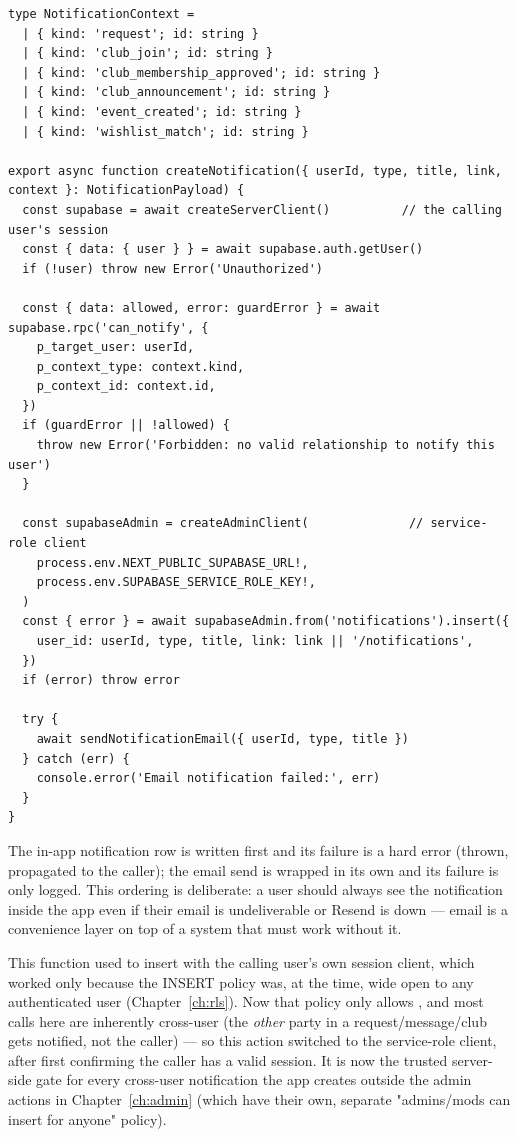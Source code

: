 \begin{lstlisting}[caption={src/lib/notifications.ts — in full}]
type NotificationContext =
  | { kind: 'request'; id: string }
  | { kind: 'club_join'; id: string }
  | { kind: 'club_membership_approved'; id: string }
  | { kind: 'club_announcement'; id: string }
  | { kind: 'event_created'; id: string }
  | { kind: 'wishlist_match'; id: string }

export async function createNotification({ userId, type, title, link, context }: NotificationPayload) {
  const supabase = await createServerClient()          // the calling user's session
  const { data: { user } } = await supabase.auth.getUser()
  if (!user) throw new Error('Unauthorized')

  const { data: allowed, error: guardError } = await supabase.rpc('can_notify', {
    p_target_user: userId,
    p_context_type: context.kind,
    p_context_id: context.id,
  })
  if (guardError || !allowed) {
    throw new Error('Forbidden: no valid relationship to notify this user')
  }

  const supabaseAdmin = createAdminClient(              // service-role client
    process.env.NEXT_PUBLIC_SUPABASE_URL!,
    process.env.SUPABASE_SERVICE_ROLE_KEY!,
  )
  const { error } = await supabaseAdmin.from('notifications').insert({
    user_id: userId, type, title, link: link || '/notifications',
  })
  if (error) throw error

  try {
    await sendNotificationEmail({ userId, type, title })
  } catch (err) {
    console.error('Email notification failed:', err)
  }
}
\end{lstlisting}

The in-app notification row is written first and its failure is a hard error (thrown, propagated to the caller); the email send is wrapped in its own  and its failure is only logged. This ordering is deliberate: a user should always see the notification inside the app even if their email is undeliverable or Resend is down — email is a convenience layer on top of a system that must work without it.

\begin{olknote}
This function used to insert with the calling user's own session client, which worked only because the  INSERT policy was, at the time, wide open to any authenticated user (Chapter~\ref{ch:rls}). Now that policy only allows , and most calls here are inherently cross-user (the \emph{other} party in a request/message/club gets notified, not the caller) — so this action switched to the service-role client, after first confirming the caller has a valid session. It is now the trusted server-side gate for every cross-user notification the app creates outside the admin actions in Chapter~\ref{ch:admin} (which have their own, separate "admins/mods can insert for anyone" policy).
\end{olknote}


